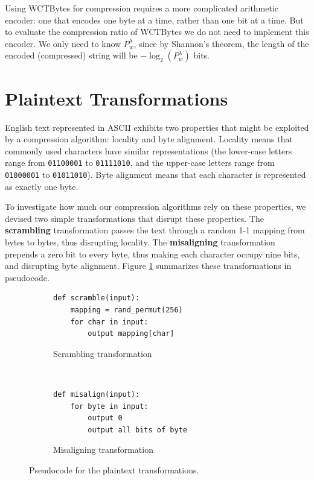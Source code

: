 \documentclass[11pt]{scrartcl}
\begin{document}
Using WCTBytes for compression requires a more complicated arithmetic encoder:
one that encodes one byte at a time, rather than one bit at a time. But to
evaluate the compression ratio of WCTBytes we do not need to implement this
encoder. We only need to know $P_w^\lambda$, since by Shannon's theorem, the
length of the encoded (compressed) string will be $-\log_2(P_w^\lambda)$ bits.


\section{Plaintext Transformations}
\label{sec:transformations}

English text represented in ASCII exhibits two properties that might be
exploited by a compression algorithm: locality and byte alignment. Locality
means that commonly used characters have similar representations (the
lower-case letters range from {\tt 01100001} to {\tt 01111010}, and the
upper-case letters range from {\tt 01000001} to {\tt 01011010}). Byte alignment
means that each character is represented as exactly one byte.

To investigate how much our compression algorithms rely on these properties, we
devised two simple transformations that disrupt these properties. The {\bf
scrambling} transformation passes the text through a random 1-1 mapping from
bytes to bytes, thus disrupting locality. The {\bf misaligning} transformation
prepends a zero bit to every byte, thus making each character occupy nine bits,
and disrupting byte alignment. Figure \ref{fig:transformations} summarizes
these transformations in pseudocode.

\begin{figure}[h!]
    \centering
    \begin{subfigure}[b]{0.45\textwidth}
\begin{verbatim}
def scramble(input):
    mapping = rand_permut(256)
    for char in input:
        output mapping[char] \end{verbatim}
        \caption{Scrambling transformation}
    \end{subfigure}
    ~
    \begin{subfigure}[b]{0.45\textwidth}
\begin{verbatim}
def misalign(input):
    for byte in input:
        output 0
        output all bits of byte \end{verbatim}
        \caption{Misaligning transformation}
    \end{subfigure}
    \caption{Pseudocode for the plaintext transformations.}
    \label{fig:transformations}
\end{figure}
\end{document}
